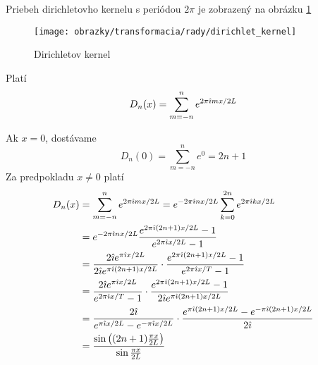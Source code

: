 Priebeh dirichletovho kernelu s periódou $2\pi$ je zobrazený na
obrázku
\ref{fig:dirichlet_kernel}

\begin{figure}[htp]
    \centering
    \texttt{[image: obrazky/transformacia/rady/dirichlet\_kernel]}
    \caption{Dirichletov kernel}
    \label{fig:dirichlet_kernel}
\end{figure}

\begin{lema}
    Platí
    \begin{equation}
        D_n(x) = \sum_{m=-n}^{n} e^{2 \pi \hat{\imath} m x/2L}
        \label{eq:dirichlet_kernel_alternative}
    \end{equation}
\end{lema}
\begin{dokaz}
    Ak $x=0$, dostávame
    \begin{equation}
        D_n(0) = \sum_{m=-n}^{n} e^0 = 2n+1
    \end{equation}
    Za predpokladu $x\not=0$ platí
    \begin{equation}
    \begin{split}
        D_n(x) &= \sum_{m=-n}^n e^{2 \pi \hat{\imath} m x/2L} 
               = e^{-2 \pi \hat{\imath} n x/2L} \sum_{k=0}^{2n} 
                        e^{2 \pi \hat{\imath} k x/2L} \\
               &= e^{-2 \pi \hat{\imath} n x/2L} 
                \frac{e^{2 \pi \hat{\imath} (2n+1) x /2L}-1}{e^{2 \pi \hat{\imath}
                x/2L}-1} \\
                &= \frac{2 \hat{\imath} e^{\pi\hat{\imath} x/2L}}{
                          2 \hat{\imath} e^{\pi\hat{\imath} (2n+1) x/2L}} \cdot
                \frac{e^{2 \pi \hat{\imath} (2n+1) x /2L}-1}{e^{2 \pi \hat{\imath}
                x/T}-1} \\
                &= \frac{2 \hat{\imath} e^{\pi \hat{\imath} x/2L}}{
                    e^{2 \pi \hat{\imath} x/T}-1} \cdot
                    \frac{e^{2 \pi \hat{\imath} (2n+1) x /2L}-1}{
                        2 \hat{\imath} e^{\pi\hat{\imath} (2n+1) x/2L}}\\
                &= \frac{2 \hat{\imath}}{
                    e^{\pi \hat{\imath} x/2L}-e^{-\pi \hat{\imath} x/2L}} \cdot
                    \frac{e^{\pi \hat{\imath} (2n+1) x /2L}-
                        e^{-\pi \hat{\imath} (2n+1) x /2L}
                    }{2 \hat{\imath}}\\
                &= \frac{\sin\left( (2n+1)\frac{\pi x}{2L} \right)}
                        {\sin \frac{\pi x}{2L}}
    \end{split}
    \end{equation}
\end{dokaz}

